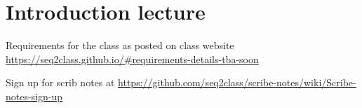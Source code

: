 \documentclass[twoside]{article}
\begin{document}



\section{Introduction lecture}
Requirements for the class as posted on class website \url{https://seq2class.github.io/#requirements-details-tba-soon}

Sign up for scrib notes at \url{https://github.com/seq2class/scribe-notes/wiki/Scribe-notes-sign-up}



\end{document}
